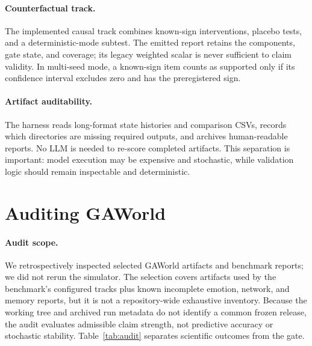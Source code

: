 \documentclass[letterpaper]{article}
\begin{document}
\paragraph{Counterfactual track.}
The implemented causal track combines known-sign interventions, placebo tests, and a deterministic-mode
subtest. The emitted report retains the components, gate state, and coverage; its legacy weighted scalar
is never sufficient to claim validity. In
multi-seed mode, a known-sign item counts as supported only if its confidence interval excludes zero and
has the preregistered sign.

\paragraph{Artifact auditability.}
The harness reads long-format state histories and comparison CSVs, records which directories are missing
required outputs, and archives human-readable reports. No LLM is needed to re-score completed artifacts.
This separation is important: model execution may be expensive and stochastic, while validation logic
should remain inspectable and deterministic.

\section{Auditing GAWorld}

\paragraph{Audit scope.}
We retrospectively inspected selected GAWorld artifacts and benchmark reports; we did not rerun the
simulator. The selection covers artifacts used by the benchmark's configured tracks plus known incomplete
emotion, network, and memory reports, but it is not a repository-wide exhaustive inventory. Because the
working tree and archived run metadata do not identify a common frozen release, the audit evaluates
admissible claim strength, not predictive accuracy or stochastic stability. Table~\ref{tab:audit}
separates scientific outcomes from the gate.
\end{document}
